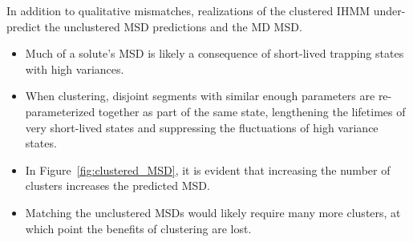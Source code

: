 \documentclass[journal=jpcbfk,manuscript=article]{achemso}
\begin{document}
  In addition to qualitative mismatches, realizations of the clustered IHMM 
  under-predict the unclustered MSD predictions and the MD MSD. 
  \begin{itemize}
    \item Much of a solute's MSD is likely a consequence of short-lived trapping states
    with high variances.
    \item When clustering, disjoint segments with similar enough parameters are
    re-parameterized together as part of the same state, lengthening the lifetimes 
    of very short-lived states and suppressing the fluctuations of high variance states.
    \item In Figure~\ref{fig:clustered_MSD}, it is evident that increasing the number
    of clusters increases the predicted MSD.
    \item Matching the unclustered MSDs would likely require many more clusters, at 
    which point the benefits of clustering are lost. 
  \end{itemize}
  
\end{document}
